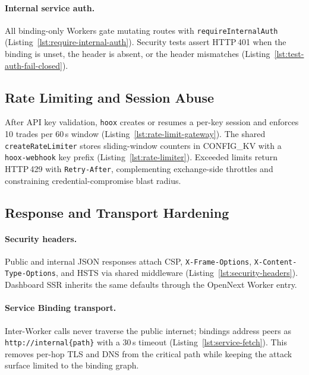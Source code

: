 \paragraph{Internal service auth.} All binding-only Workers gate mutating routes with \texttt{requireInternalAuth} (Listing~\ref{lst:require-internal-auth}). Security tests assert HTTP\,401 when the binding is unset, the header is absent, or the header mismatches (Listing~\ref{lst:test-auth-fail-closed}).

\subsection{Rate Limiting and Session Abuse}

After API key validation, \texttt{hoox} creates or resumes a per-key session and enforces 10 trades per 60\,s window (Listing~\ref{lst:rate-limit-gateway}). The shared \texttt{createRateLimiter} stores sliding-window counters in CONFIG\_KV with a \texttt{hoox-webhook} key prefix (Listing~\ref{lst:rate-limiter}). Exceeded limits return HTTP\,429 with \texttt{Retry-After}, complementing exchange-side throttles and constraining credential-compromise blast radius.


\subsection{Response and Transport Hardening}

\paragraph{Security headers.} Public and internal JSON responses attach CSP, \texttt{X-Frame-Options}, \texttt{X-Content-Type-Options}, and HSTS via shared middleware (Listing~\ref{lst:security-headers}). Dashboard SSR inherits the same defaults through the OpenNext Worker entry.


\paragraph{Service Binding transport.} Inter-Worker calls never traverse the public internet; bindings address peers as \texttt{http://internal\{path\}} with a 30\,s timeout (Listing~\ref{lst:service-fetch}). This removes per-hop TLS and DNS from the critical path while keeping the attack surface limited to the binding graph.

